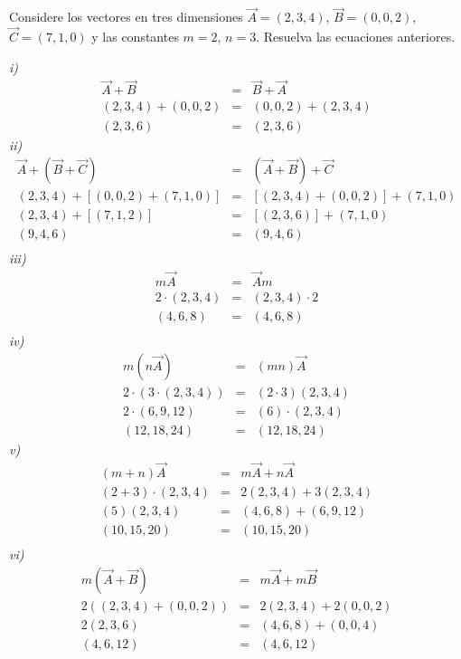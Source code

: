 \begin{myexample}
Considere los vectores en tres dimensiones $\vec{A}=(2,3,4)$, $\vec{B}=(0,0,2)$, $\vec{C}=(7,1,0)$ y las constantes $m=2$, $n=3$. Resuelva las ecuaciones anteriores.
\end{myexample}
\noindent\textit{i)} \\
\begin{eqnarray*}
\vec{A}+\vec{B}&=&\vec{B}+\vec{A}\\
(2,3,4)+(0,0,2)&=& (0,0,2)+(2,3,4)\\
(2,3,6)&=& (2,3,6)
\end{eqnarray*}
\noindent\textit{ii)} \\
\begin{eqnarray*}
\vec{A}+(\vec{B}+\vec{C})&=&(\vec{A}+\vec{B})+\vec{C}\\
(2,3,4)+\left[(0,0,2)+ (7,1,0)\right]&=&\left[(2,3,4)+(0,0,2)\right]+(7,1,0)\\
(2,3,4)+\left[(7,1,2) \right]&=&\left[(2,3,6) \right]+(7,1,0)\\
(9,4,6)&=&(9,4,6)\\
\end{eqnarray*}
\noindent\textit{iii)} \\
\begin{eqnarray*}
m\vec{A}&=&\vec{A}m\\
2\cdot (2,3,4) &=& (2,3,4)\cdot 2\\
(4,6,8)&=& (4,6,8)\\
\end{eqnarray*}
\noindent\textit{iv)} \\
\begin{eqnarray*}
m(n\vec{A})&=&(mn)\vec{A}\\
2\cdot(3\cdot(2,3,4))&=&(2\cdot 3)(2,3,4)\\
2\cdot (6,9,12)&=&(6)\cdot (2,3,4)\\
(12,18,24)&=&(12,18,24)
\end{eqnarray*}
\noindent\textit{v)} \\
\begin{eqnarray*}
(m+n)\vec{A}&=&m\vec{A}+n\vec{A}\\
(2+3)\cdot(2,3,4)&=&2(2,3,4)+3(2,3,4)\\
(5)(2,3,4)&=&(4,6,8)+(6,9,12)\\
(10,15,20)&=&(10,15,20)\\
\end{eqnarray*}
\noindent\textit{vi)} \\
\begin{eqnarray*}
m(\vec{A}+\vec{B})&=&m\vec{A}+m\vec{B}\\
2((2,3,4)+(0,0,2))&=&2(2,3,4)+2(0,0,2)\\
2(2,3,6)&=&(4,6,8)+(0,0,4)\\
(4,6,12)&=&(4,6,12)\\
\end{eqnarray*}




